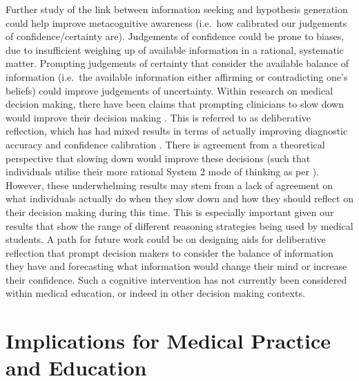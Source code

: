 \documentclass[a4paper, nobind]{templates/ociamthesis}
\begin{document}
Further study of the link between information seeking and hypothesis generation could help improve metacognitive awareness (i.e.~how calibrated our judgements of confidence/certainty are). Judgements of confidence could be prone to biases, due to insufficient weighing up of available information in a rational, systematic matter. Prompting judgements of certainty that consider the available balance of information (i.e.~the available information either affirming or contradicting one's beliefs) could improve judgements of uncertainty. Within research on medical decision making, there have been claims that prompting clinicians to slow down would improve their decision making \autocite{lambe_dual-process_2016}. This is referred to as deliberative reflection, which has had mixed results in terms of actually improving diagnostic accuracy and confidence calibration \autocite{mamede_effect_2010,lambe_guided_2018,costa_filho_effects_2019,kuhn_learning_2023}. There is agreement from a theoretical perspective that slowing down would improve these decisions (such that individuals utilise their more rational System 2 mode of thinking as per \textcite{kahneman_thinking_2011}). However, these underwhelming results may stem from a lack of agreement on what individuals actually do when they slow down and how they should reflect on their decision making during this time. This is especially important given our results that show the range of different reasoning strategies being used by medical students. A path for future work could be on designing aids for deliberative reflection that prompt decision makers to consider the balance of information they have and forecasting what information would change their mind or increase their confidence. Such a cognitive intervention has not currently been considered within medical education, or indeed in other decision making contexts.

\section{Implications for Medical Practice and Education}\label{implications-for-medical-practice-and-education}
\end{document}
